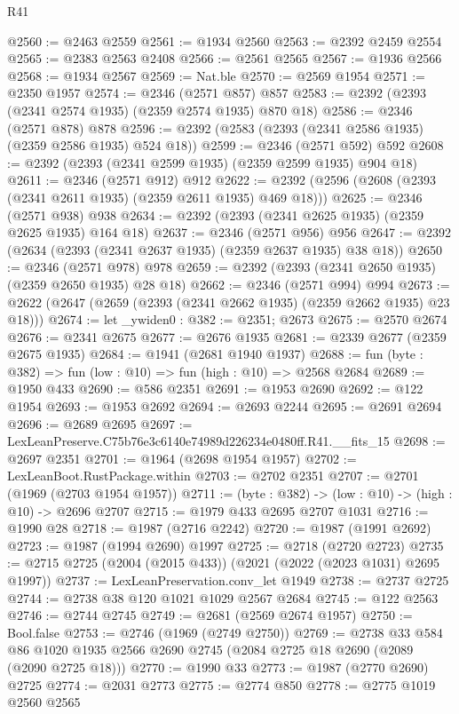 \begin{lexlean}{R41}
\begin{coremodule}
@2560 := @2463 @2559
@2561 := @1934 @2560
@2563 := @2392 @2459 @2554
@2565 := @2383 @2563 @2408
@2566 := @2561 @2565
@2567 := @1936 @2566
@2568 := @1934 @2567
@2569 := Nat.ble
@2570 := @2569 @1954
@2571 := @2350 @1957
@2574 := @2346 (@2571 @857) @857
@2583 := @2392 (@2393 (@2341 @2574 @1935) (@2359 @2574 @1935) @870 @18)
@2586 := @2346 (@2571 @878) @878
@2596 := @2392 (@2583 (@2393 (@2341 @2586 @1935) (@2359 @2586 @1935) @524 @18))
@2599 := @2346 (@2571 @592) @592
@2608 := @2392 (@2393 (@2341 @2599 @1935) (@2359 @2599 @1935) @904 @18)
@2611 := @2346 (@2571 @912) @912
@2622 := @2392 (@2596 (@2608 (@2393 (@2341 @2611 @1935) (@2359 @2611 @1935) @469 @18)))
@2625 := @2346 (@2571 @938) @938
@2634 := @2392 (@2393 (@2341 @2625 @1935) (@2359 @2625 @1935) @164 @18)
@2637 := @2346 (@2571 @956) @956
@2647 := @2392 (@2634 (@2393 (@2341 @2637 @1935) (@2359 @2637 @1935) @38 @18))
@2650 := @2346 (@2571 @978) @978
@2659 := @2392 (@2393 (@2341 @2650 @1935) (@2359 @2650 @1935) @28 @18)
@2662 := @2346 (@2571 @994) @994
@2673 := @2622 (@2647 (@2659 (@2393 (@2341 @2662 @1935) (@2359 @2662 @1935) @23 @18)))
@2674 := let _ywiden0 : @382 := @2351; @2673
@2675 := @2570 @2674
@2676 := @2341 @2675
@2677 := @2676 @1935
@2681 := @2339 @2677 (@2359 @2675 @1935)
@2684 := @1941 (@2681 @1940 @1937)
@2688 := fun (byte : @382) => fun (low : @10) => fun (high : @10) => @2568 @2684
@2689 := @1950 @433
@2690 := @586 @2351
@2691 := @1953 @2690
@2692 := @122 @1954
@2693 := @1953 @2692
@2694 := @2693 @2244
@2695 := @2691 @2694
@2696 := @2689 @2695
@2697 := LexLeanPreserve.C75b76e3c6140e74989d226234e0480ff.R41.__fits_15
@2698 := @2697 @2351
@2701 := @1964 (@2698 @1954 @1957)
@2702 := LexLeanBoot.RustPackage.within
@2703 := @2702 @2351
@2707 := @2701 (@1969 (@2703 @1954 @1957))
@2711 := (byte : @382) -> (low : @10) -> (high : @10) -> @2696 @2707
@2715 := @1979 @433 @2695 @2707 @1031
@2716 := @1990 @28
@2718 := @1987 (@2716 @2242)
@2720 := @1987 (@1991 @2692)
@2723 := @1987 (@1994 @2690) @1997
@2725 := @2718 (@2720 @2723)
@2735 := @2715 @2725 (@2004 (@2015 @433)) (@2021 (@2022 (@2023 @1031) @2695 @1997))
@2737 := LexLeanPreservation.conv_let @1949
@2738 := @2737 @2725
@2744 := @2738 @38 @120 @1021 @1029 @2567 @2684
@2745 := @122 @2563
@2746 := @2744 @2745
@2749 := @2681 (@2569 @2674 @1957)
@2750 := Bool.false
@2753 := @2746 (@1969 (@2749 @2750))
@2769 := @2738
    @33
    @584
    @86
    @1020
    @1935
    @2566
    @2690
    @2745
    (@2084 @2725 @18 @2690 (@2089 (@2090 @2725 @18)))
@2770 := @1990 @33
@2773 := @1987 (@2770 @2690) @2725
@2774 := @2031 @2773
@2775 := @2774 @850
@2778 := @2775 @1019 @2560 @2565

\end{coremodule}
\end{lexlean}
